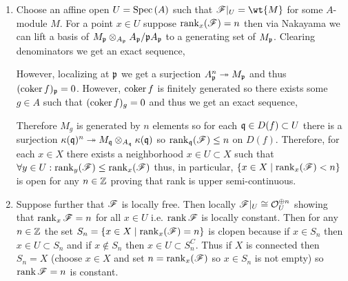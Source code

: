 \documentclass[12pt]{article}
\begin{document}
\begin{enumerate}
\item Choose an affine open $U = \mathrm{Spec}\left( A \right)$ such that $\F|_U = \wt{M}$ for some $A$-module $M$. For a point $x \in U$ suppose $\operatorname{\mathrm{rank}}_{x}(\mathscr{F}) = n$ then via Nakayama we can lift a basis of $M_{\mathfrak{p}} \otimes_{A_{\mathfrak{p}}} A_{\mathfrak{p}} / \mathfrak{p} A_{\mathfrak{p}}$ to a generating set of $M_{\mathfrak{p}}$. Clearing denominators we get an exact sequence, 
\begin{center}
\end{center}
However, localizing at $\mathfrak{p}$ we get a surjection $A_{\mathfrak{p}}^n \twoheadrightarrow M_{\mathfrak{p}}$ and thus $(\operatorname{\mathrm{coker}}{f})_{\mathfrak{p}} = 0$. However, $\operatorname{\mathrm{coker}}{f}$ is finitely generated so there exists some $g \in A$ such that $(\operatorname{\mathrm{coker}}{f})_g = 0$ and thus we get an exact sequence,
\begin{center}
\end{center}
Therefore $M_g$ is generated by $n$ elements so for each $\mathfrak{q} \in D(f) \subset U$ there is a surjection $\kappa(\mathfrak{q})^n \twoheadrightarrow M_{\mathfrak{q}} \otimes_{A_{\mathfrak{q}}} \kappa(\mathfrak{q})$ so $\operatorname{\mathrm{rank}}_{\mathfrak{q}}(\mathscr{F}) \le n$ on $D(f)$. Therefore, for each $x \in X$ there exists a neighborhood $x \in U \subset X$ such that $\forall y \in U : \operatorname{\mathrm{rank}}_y(\mathscr{F}) \le \operatorname{\mathrm{rank}}_x(\mathscr{F})$ thus, in particular, $\{ x \in X \mid \operatorname{\mathrm{rank}}_x(\mathscr{F}) < n \}$ is open for any $n \in \mathbb{Z}$ proving that rank is upper semi-continuous.

\item Suppose further that $\mathscr{F}$ is locally free. Then locally $\mathscr{F}|_U \cong \mathcal{O}_{U}^{\oplus n}$ showing that $\operatorname{\mathrm{rank}}_x{\mathscr{F}} = n$ for all $x \in U$ i.e. $\operatorname{\mathrm{rank}}{\mathscr{F}}$ is locally constant. Then for any $n \in \mathbb{Z}$ the set $S_n = \{ x \in X \mid \operatorname{\mathrm{rank}}_x(\mathscr{F}) = n \}$ is clopen because if $x \in S_n$ then $x \in U \subset S_n$ and if $x \notin S_n$ then $x \in U \subset S_n^C$. Thus if $X$ is connected then $S_n = X$ (choose $x \in X$ and set $n = \operatorname{\mathrm{rank}}_x(\mathscr{F})$ so $x \in S_n$ is not empty) so $\operatorname{\mathrm{rank}}{\mathscr{F}} = n$ is constant.


\end{enumerate}
\end{document}

